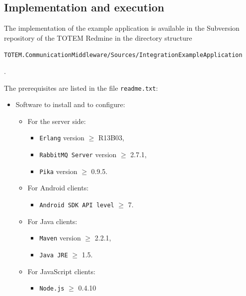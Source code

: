 \newpage

\subsection{Implementation and execution}
\label{SS_integration_implementation}

The implementation of the example application is available in the
Subversion repository of the TOTEM Redmine in the directory
structure \begin{small}\texttt{TOTEM.CommunicationMiddleware/\-Sources/\-Integration\-Example\-Application}\end{small}.

The prerequisites are listed in the file \texttt{readme.txt}:
\begin{itemize}
\item Software to install and to configure:
\begin{itemize}
\item For the server side:
\begin{itemize}
\item \texttt{Erlang} version $\geq$ R13B03,
\item \texttt{RabbitMQ Server} version $\geq$ 2.7.1,
\item \texttt{Pika} version $\geq$ 0.9.5.
\end{itemize}
\item For Android clients:
\begin{itemize}
\item \texttt{Android SDK API level} $\geq$ 7.
\end{itemize}
\item For Java clients:
\begin{itemize}
\item \texttt{Maven} version $\geq$ 2.2.1,
\item \texttt{Java JRE} $\geq$ 1.5.
\end{itemize}
\item For JavaScript clients:
\begin{itemize}
\item \texttt{Node.js} $\geq$ 0.4.10
\end{itemize}
\end{itemize}


\end{itemize}
